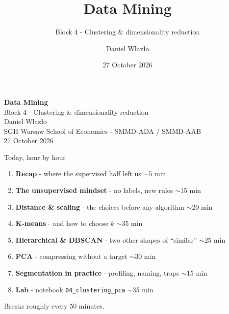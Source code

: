 \documentclass[10pt,aspectratio=169]{beamer}
\title[Data Mining]{Data Mining}
\subtitle{Block 4 - Clustering \& dimensionality reduction}
\author{Daniel Wlazło}
\institute{SGH Warsaw School of Economics - SMMD-ADA / SMMD-AAB}
\date{27 October 2026}
\begin{document}
\begin{frame}[plain]
  \begin{center}
    \vspace{1cm}
    {\LARGE\textbf{Data Mining}}\\[0.5cm]
    {\large Block 4 - Clustering \& dimensionality reduction}\\[1.5cm]
    {\large Daniel Wlazło} \\[0.2cm]
    {\small SGH Warsaw School of Economics - SMMD-ADA / SMMD-AAB} \\[0.2cm]
    {\small 27 October 2026}
  \end{center}
\end{frame}

\begin{frame}{Today, hour by hour}
  \begin{enumerate}
    \item \textbf{Recap} - where the supervised half left us \hfill {\small$\sim$5 min}
    \item \textbf{The unsupervised mindset} - no labels, new rules \hfill {\small$\sim$15 min}
    \item \textbf{Distance \& scaling} - the choices before any algorithm \hfill {\small$\sim$20 min}
    \item \textbf{K-means} - and how to choose $k$ \hfill {\small$\sim$35 min}
    \item \textbf{Hierarchical \& DBSCAN} - two other shapes of ``similar'' \hfill {\small$\sim$25 min}
    \item \textbf{PCA} - compressing without a target \hfill {\small$\sim$30 min}
    \item \textbf{Segmentation in practice} - profiling, naming, traps \hfill {\small$\sim$15 min}
    \item \textbf{Lab} - notebook \texttt{04\_clustering\_pca} \hfill {\small$\sim$35 min}
  \end{enumerate}
  \vspace{0.3em}
  \begin{center}\small Breaks roughly every 50 minutes.\end{center}
\end{frame}
\end{document}
